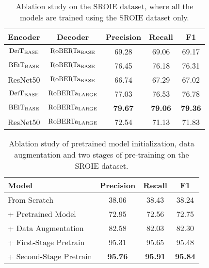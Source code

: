 \documentclass[letterpaper]{article} \usepackage{aaai23}  \usepackage{times}  \usepackage{helvet}  \usepackage{courier}  \usepackage[hyphens]{url}  \usepackage{graphicx} \urlstyle{rm} \def\UrlFont{\rm}  \usepackage{natbib}  \usepackage{caption} \frenchspacing  \setlength{\pdfpagewidth}{8.5in} \setlength{\pdfpageheight}{11in} \usepackage{algorithm}
\begin{document}
\begin{table}[ht]
\centering
\small
\begin{tabular}{ccccc}
\hline
\textbf{Encoder} & \textbf{Decoder}  & \textbf{Precision} & \textbf{Recall} & \textbf{F1}    \\
\hline
$\textrm{DeiT}_{\rm BASE}$             & $\textrm{RoBERTa}_{\rm BASE}$  & 69.28              & 69.06           & 69.17          \\
$\textrm{BEiT}_{\rm BASE}$             & $\textrm{RoBERTa}_{\rm BASE}$  & 76.45              & 76.18           & 76.31          \\
ResNet50         & $\textrm{RoBERTa}_{\rm BASE}$  & 66.74              & 67.29           & 67.02          \\
$\textrm{DeiT}_{\rm BASE}$             & $\textrm{RoBERTa}_{\rm LARGE}$ & 77.03              & 76.53           & 76.78          \\
$\textrm{BEiT}_{\rm BASE}$             & $\textrm{RoBERTa}_{\rm LARGE}$ & \textbf{79.67}     & \textbf{79.06}  & \textbf{79.36} \\
ResNet50         & $\textrm{RoBERTa}_{\rm LARGE}$ & 72.54              & 71.13           & 71.83          \\
\hline
\end{tabular}
\caption{Ablation study on the SROIE dataset, where all the models are trained using the SROIE dataset only.}
\label{tab:ablation}
\end{table}

\begin{table}
\centering
\begin{tabular}{lccc}
\hline
\textbf{Model}          & \textbf{Precision} & \textbf{Recall} & \textbf{F1}    \\ \hline
From Scratch            & 38.06              & 38.43           & 38.24          \\
+ Pretrained Model      & 72.95              & 72.56           & 72.75          \\
+ Data Augmentation     & 82.58              & 82.03           & 82.30          \\
+ First-Stage Pretrain  & 95.31              & 95.65           & 95.48          \\
+ Second-Stage Pretrain & \textbf{95.76}     & \textbf{95.91}  & \textbf{95.84} \\ \hline
\end{tabular}
\caption{Ablation study of pretrained model initialization, data augmentation and two stages of pre-training on the SROIE dataset.}
\label{tab:ablation2}
\end{table}
\end{document}
